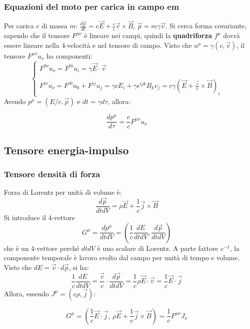 \documentclass[10pt, a4paper]{scrartcl}
\numberwithin{equation}{subsection}
\theoremstyle{style1}
\newenvironment{boxenv}[1][]{
    \begin{eqbox}[#1]
    }{
   \end{eqbox}
}
\begin{document}
\subsubsection{Equazioni del moto per carica in campo em}
Per carica $e$ di massa $m$: $\frac{d \vec{p}}{d t} = e\vec{E}+ \frac{e}{c}\vec{v}\times \vec{B}$, $\vec{p}=m\gamma\vec{v}$. Si cerca forma covariante, sapendo che il tensore $F^{\mu \nu } $ \`e lineare nei campi, quindi la \textbf{quadriforza} $f^\mu $ dovr\`a essere lineare nella 4-velocit\`a e nel tensore di campo. Visto che $u^\mu  = \gamma(c,\vec{v})$, il tensore $F^{\mu \nu } u_\nu $ ha componenti:
\begin{equation}
	\begin{cases}
	F^{0\nu } u_\nu =F^{0i} u_i = \gamma \vec{E}\cdot \vec{v}\\
	\\
\displaystyle F^{i \nu } u_\nu = F^{i 0} u_0 + F^{ij} u_j = \gamma c E_i + \gamma \epsilon ^{ijk} B_k v_j = c \gamma\left(\vec{E}+ \frac{\vec{v}}{c} \times \vec{B}\right) _i
\end{cases}
\end{equation}
Avendo $p^\mu  = (E / c , \vec{p})$ e $dt = \gamma d\tau $, allora:
\begin{boxenv}[]
\begin{equation}
	\frac{d p^\mu }{d \tau } = \frac{e}{c}F^{\mu \nu } u_\nu 
\end{equation}
\end{boxenv}
\subsection{Tensore energia-impulso}
\subsubsection{Tensore densit\`a di forza}

Forza di Lorentz per unit\`a di volume \`e:
\[
\frac{d \vec{p}}{d tdV} = \rho  \vec{E}+ \frac{1}{c}\vec{j}\times \vec{B}
\] 
Si introduce il 4-vettore
\begin{equation}
	G^\mu = \frac{d p^\mu }{d t dV} = \left(\frac{1}{c} \frac{d E}{d t dV} , \frac{d \vec{p}}{d t dV} \right) 
\end{equation}
che \`e un 4-vettore perch\'e $dt dV$ \`e uno scalare di Lorentz. A parte fattore $c^{-1} $, la componente temporale \`e lavoro svolto dal campo per unit\`a di tempo e volume. Visto che $dE = \vec{v}\cdot d\vec{p}$, si ha:
\[
\frac{1}{c}\frac{d E}{d t dV} = \frac{\vec{v}}{c} \cdot \frac{d \vec{p}}{d t dV} =\frac{1}{c} \rho \vec{E}\cdot \vec{v} = \frac{1}{c}\vec{E}\cdot \vec{j}
\] 
Allora, essendo $J^\mu  = (c\rho ,\vec{j})$:
\begin{boxenv}[]
\begin{equation}
	G^\mu  = \left(\frac{1}{c}\vec{E}\cdot \vec{j},\ \rho  \vec{E}+ \frac{1}{c}\vec{j}\times \vec{B}\right)  = \frac{1}{c} F^{\mu \nu } J_\nu 
\end{equation}
\end{boxenv}
\end{document}
